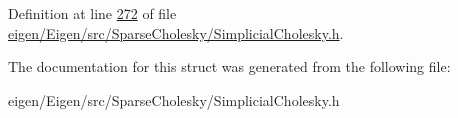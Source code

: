 Definition at line \hyperlink{eigen_2_eigen_2src_2_sparse_cholesky_2_simplicial_cholesky_8h_source_l00272}{272} of file \hyperlink{eigen_2_eigen_2src_2_sparse_cholesky_2_simplicial_cholesky_8h_source}{eigen/\+Eigen/src/\+Sparse\+Cholesky/\+Simplicial\+Cholesky.\+h}.



The documentation for this struct was generated from the following file\+:\begin{DoxyCompactItemize}
\item 
eigen/\+Eigen/src/\+Sparse\+Cholesky/\+Simplicial\+Cholesky.\+h\end{DoxyCompactItemize}
